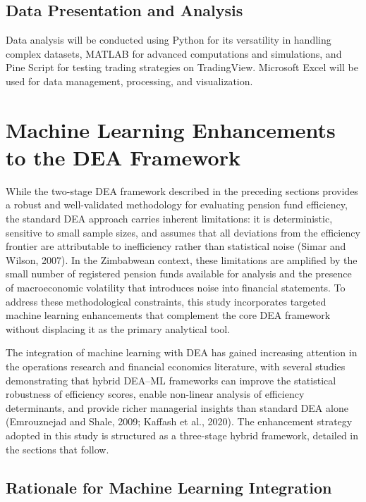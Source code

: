 \documentclass[12pt,a4paper]{article}
\begin{document}
\subsection{Data Presentation and Analysis}

Data analysis will be conducted using Python for its versatility in handling complex datasets, MATLAB for advanced computations and simulations, and Pine Script for testing trading strategies on TradingView. Microsoft Excel will be used for data management, processing, and visualization.

\section{Machine Learning Enhancements to the DEA Framework}

While the two-stage DEA framework described in the preceding sections provides a robust and well-validated methodology for evaluating pension fund efficiency, the standard DEA approach carries inherent limitations: it is deterministic, sensitive to small sample sizes, and assumes that all deviations from the efficiency frontier are attributable to inefficiency rather than statistical noise (Simar and Wilson, 2007). In the Zimbabwean context, these limitations are amplified by the small number of registered pension funds available for analysis and the presence of macroeconomic volatility that introduces noise into financial statements. To address these methodological constraints, this study incorporates targeted machine learning enhancements that complement the core DEA framework without displacing it as the primary analytical tool.

The integration of machine learning with DEA has gained increasing attention in the operations research and financial economics literature, with several studies demonstrating that hybrid DEA--ML frameworks can improve the statistical robustness of efficiency scores, enable non-linear analysis of efficiency determinants, and provide richer managerial insights than standard DEA alone (Emrouznejad and Shale, 2009; Kaffash et al., 2020). The enhancement strategy adopted in this study is structured as a three-stage hybrid framework, detailed in the sections that follow.

\subsection{Rationale for Machine Learning Integration}
\end{document}
